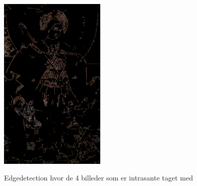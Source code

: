 \begin{figure}[!h]
{        \includegraphics[angle=0,width=0.45\textwidth]{afsnit/afprovning/billeder/thressholds/krafitige_farver/krafite_detalier/2_iteration/300-800.png}
        \label{300-800}}\hspace{1em}
    \\
        \caption[]{Edgedetection hvor de 4 billeder som er intrasante taget med}
     \label{allesammen3}
\end{figure}
 
